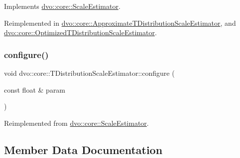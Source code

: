 Implements \mbox{\hyperlink{classdvo_1_1core_1_1_scale_estimator_a6968ac2cd37c2ce1c966f0c9e17d1a3c}{dvo\+::core\+::\+Scale\+Estimator}}.



Reimplemented in \mbox{\hyperlink{classdvo_1_1core_1_1_approximate_t_distribution_scale_estimator_aee2b37700df1eb0125b8e0d352f7ceab}{dvo\+::core\+::\+Approximate\+T\+Distribution\+Scale\+Estimator}}, and \mbox{\hyperlink{classdvo_1_1core_1_1_optimized_t_distribution_scale_estimator_ace9304a785bd16a6ef5cf4a52f3c6299}{dvo\+::core\+::\+Optimized\+T\+Distribution\+Scale\+Estimator}}.

\mbox{\label{classdvo_1_1core_1_1_t_distribution_scale_estimator_a34ec79e7811c148606817510a00aa585}} 
\subsubsection{\texorpdfstring{configure()}{configure()}}
{\footnotesize\ttfamily void dvo\+::core\+::\+T\+Distribution\+Scale\+Estimator\+::configure (\begin{DoxyParamCaption}\item[{const float \&}]{param }\end{DoxyParamCaption})\hspace{0.3cm}{\ttfamily [virtual]}}



Reimplemented from \mbox{\hyperlink{classdvo_1_1core_1_1_scale_estimator_a58b5d7926b08e85e7393436156f3ef43}{dvo\+::core\+::\+Scale\+Estimator}}.



\subsection{Member Data Documentation}
\mbox{\label{classdvo_1_1core_1_1_t_distribution_scale_estimator_a031ff291023c516c23bce04b34b79957}} 

